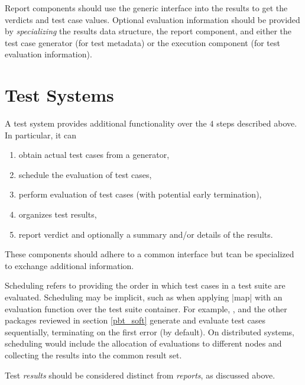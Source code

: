 Report components should use the generic interface into 
the results to get the verdicts and test case values.
Optional evaluation information should be provided by 
\emph{specializing} the results data structure, the report component,
and either the test case generator (for test metadata) or
the execution component (for test evaluation information).

\section{Test Systems}


A test system provides additional functionality over the $4$ steps described above.
In particular, it can

\begin{enumerate}
\item obtain actual test cases from a generator,
\item schedule the evaluation of test cases,
\item perform evaluation of test cases (with potential early termination),
\item organizes test results,
\item report verdict and optionally a summary and/or details of the results.
\end{enumerate}

\noindent
These components should adhere to a common interface
but tcan be specialized to exchange additional information.

Scheduling refers to providing the order in which test cases in a test suite are evaluated.
Scheduling may be implicit,
such as when applying |map| with an evaluation function over the test suite container.
For example,
\QC, \SC and the other packages reviewed in section \ref{pbt_soft}
generate and evaluate test cases sequentially,
terminating on the first error (by default).
On distributed systems, scheduling would include 
the allocation of evaluations to different nodes
and collecting the results into the common result set.

Test \emph{results} should be considered distinct from \emph{reports}, as discussed above.
